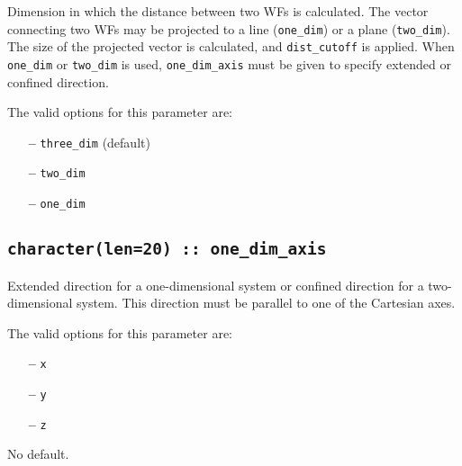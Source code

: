 Dimension in which the distance between two WFs is calculated.
The vector connecting two WFs may be projected
to a line (\verb#one_dim#) or a plane (\verb#two_dim#).
The size of the projected vector
is calculated, and \verb#dist_cutoff# is applied.
When \verb#one_dim# or \verb#two_dim#
is used, \verb#one_dim_axis# must be given
to specify extended or confined direction.

The valid options for this parameter are:
\begin{itemize}
\item[{\bf --}] \verb#three_dim#  (default)
\item[{\bf --}] \verb#two_dim#
\item[{\bf --}] \verb#one_dim#
\end{itemize}

\subsection[one\_dim\_axis]{\tt character(len=20) :: one\_dim\_axis}

Extended direction for a one-dimensional system
or confined direction for a two-dimensional system.
This direction must be parallel to one of the Cartesian axes.

The valid options for this parameter are:
\begin{itemize}
\item[{\bf --}] \verb#x#
\item[{\bf --}] \verb#y#
\item[{\bf --}] \verb#z#
\end{itemize}

No default.


%

